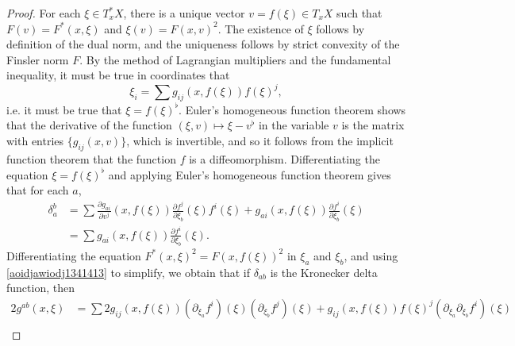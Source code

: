 \begin{proof}
  For each $\xi \in T_x^* X$, there is a unique vector $v = f(\xi) \in T_x X$ such that $F(v) = F^*(x,\xi)$ and $\xi(v) = F(x,v)^2$. The existence of $\xi$ follows by definition of the dual norm, and the uniqueness follows by strict convexity of the Finsler norm $F$. By the method of Lagrangian multipliers and the fundamental inequality, it must be true in coordinates that
  \begin{equation} \label{iojwoawijdoi12312}
    \xi_i = \sum g_{ij}(x,f(\xi)) f(\xi)^j,
  \end{equation}
  i.e. it must be true that $\xi = f(\xi)^\flat$. Euler's homogeneous function theorem shows that the derivative of the function $(\xi,v) \mapsto \xi - v^\flat$ in the variable $v$ is the matrix with entries $\{ g_{ij}(x,v) \}$, which is invertible, and so it follows from the implicit function theorem that the function $f$ is a diffeomorphism. Differentiating the equation $\xi = f(\xi)^\flat$ and applying Euler's homogeneous function theorem gives that for each $a$,
  \begin{equation} \label{aoidjawiodj1341413}
  \begin{split}
    \delta_a^b &= \sum \frac{\partial g_{ai}}{\partial v^j}(x,f(\xi)) \frac{\partial f^j}{\partial \xi_b}(\xi) f^i(\xi) + g_{ai}(x,f(\xi)) \frac{\partial f^i}{\partial \xi_b}(\xi)\\
    &= \sum g_{ai}(x,f(\xi)) \frac{\partial f^i}{\partial \xi_b}(\xi).
  \end{split}
  \end{equation}
  Differentiating the equation $F^*( x,\xi )^2 = F( x, f(\xi) )^2$ in $\xi_a$ and $\xi_b$, and using \eqref{aoidjawiodj1341413} to simplify, we obtain that if $\delta_{ab}$ is the Kronecker delta function, then
  \begin{equation} \label{14i04i1204912}
  \begin{split}
    2 g^{ab}(x,\xi) &= \sum 2 g_{ij}(x,f(\xi)) (\partial_{\xi_a} f^i)(\xi) ( \partial_{\xi_b} f^j )(\xi) + g_{ij}(x,f(\xi)) f(\xi)^j ( \partial_{\xi_a} \partial_{\xi_b} f^i )(\xi)\\

\end{split}
\end{equation}
\end{proof}

